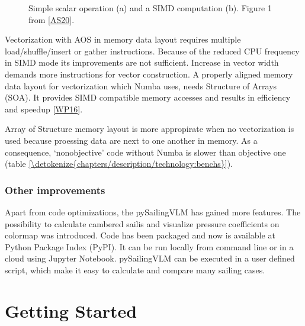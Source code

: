 \documentclass[letterpaper,10pt,english]{jupyterBook}
\let\sphinxpxdimen\pdfpxdimen\else\newdimen\sphinxpxdimen
\begin{document}
\begin{figure}[htbp]
\centering
\capstart

\noindent\sphinxincludegraphics[height=200\sphinxpxdimen]{{simd_fig}.png}
\caption{Simple scalar operation (a) and a SIMD computation (b). Figure 1 from {[}\hyperlink{cite.chapters/bibliography:id12}{AS20}{]}.}\label{\detokenize{chapters/description/technology:simd-fig}}\end{figure}

\sphinxAtStartPar
Vectorization with AOS in memory data layout requires multiple load/shuffle/insert or gather instructions. Because of the reduced CPU frequency in SIMD mode its improvements are not sufficient. Increase in vector width demands more instructions for vector construction. A properly aligned memory data layout for vectorization which Numba uses, needs Structure of Arrays (SOA). It provides SIMD compatible memory accesses and results in efficiency and speedup {[}\hyperlink{cite.chapters/bibliography:id13}{WP16}{]}.

\sphinxAtStartPar
Array of Structure memory layout is more appropirate when no vectorization is used because proessing data are next to one another in memory. As a consequence, ‘non\sphinxhyphen{}objective’ code without Numba is slower than objective one (table \hyperref[\detokenize{chapters/description/technology:benchs}]{\ref{\detokenize{chapters/description/technology:benchs}}}).


\section{Other improvements}
\label{\detokenize{chapters/description/technology:other-improvements}}
\sphinxAtStartPar
Apart from code optimizations, the pySailingVLM has gained more features. The possibility to calculate cambered sailis and visualize pressure coefficients on colormap was introduced. Code has been packaged and now is available at Python Package Index (PyPI). It can be run locally from command line or in a cloud using Jupyter Notebook. pySailingVLM can be executed in a user defined script, which make it easy to calculate and compare many sailing cases.

\sphinxstepscope


\part{Getting Started}

\sphinxstepscope
\end{document}

